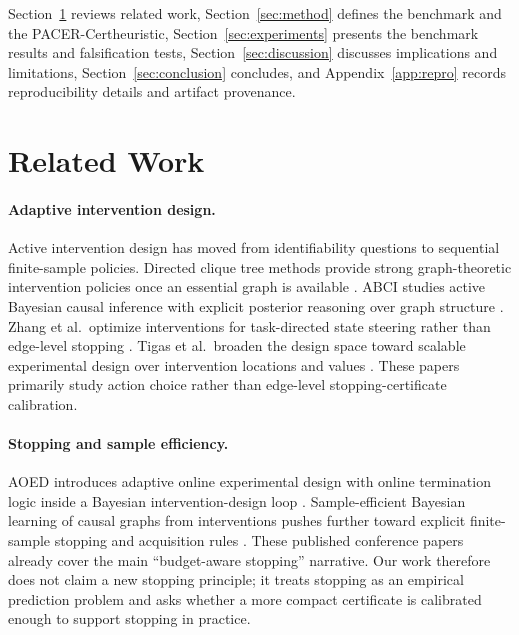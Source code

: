 \documentclass{article}
\newcommand{\method}{PACER-Cert}
\begin{document}
Section~\ref{sec:related} reviews related work, Section~\ref{sec:method} defines the benchmark and the \method heuristic, Section~\ref{sec:experiments} presents the benchmark results and falsification tests, Section~\ref{sec:discussion} discusses implications and limitations, Section~\ref{sec:conclusion} concludes, and Appendix~\ref{app:repro} records reproducibility details and artifact provenance.

\section{Related Work}
\label{sec:related}

\paragraph{Adaptive intervention design.}
Active intervention design has moved from identifiability questions to sequential finite-sample policies. Directed clique tree methods provide strong graph-theoretic intervention policies once an essential graph is available \citep{squires2020dct}. ABCI studies active Bayesian causal inference with explicit posterior reasoning over graph structure \citep{toth2022abci}. Zhang et al.\ optimize interventions for task-directed state steering rather than edge-level stopping \citep{zhang2023optimal}. Tigas et al.\ broaden the design space toward scalable experimental design over intervention locations and values \citep{tigas2022where}. These papers primarily study action choice rather than edge-level stopping-certificate calibration.

\paragraph{Stopping and sample efficiency.}
AOED introduces adaptive online experimental design with online termination logic inside a Bayesian intervention-design loop \citep{elahi2024aoed}. Sample-efficient Bayesian learning of causal graphs from interventions pushes further toward explicit finite-sample stopping and acquisition rules \citep{zhou2024sampleefficient}. These published conference papers already cover the main ``budget-aware stopping'' narrative. Our work therefore does not claim a new stopping principle; it treats stopping as an empirical prediction problem and asks whether a more compact certificate is calibrated enough to support stopping in practice.
\end{document}
